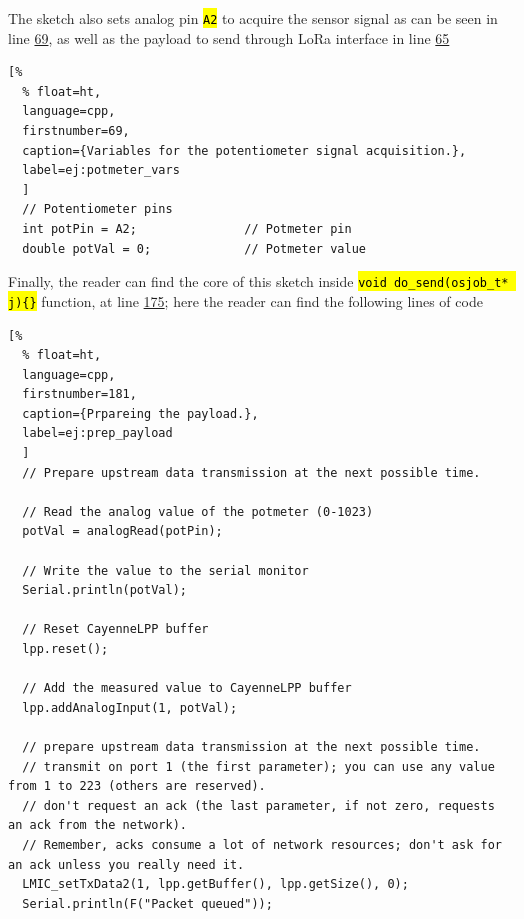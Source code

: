 \documentclass[11pt,a4paper,dvipsnames,twoside]{article}
\newcommand{\cmd}[1] {\hl{\texttt{#1}}}
\begin{document}
The sketch also sets analog pin \cmd{A2} to acquire the sensor signal as can be seen in line \href{https://github.com/WyRe/lora-arduino-dendrometer/blob/master/src/arduino/dendro/dendro.ino#L69}{69}, as well as the payload to send through LoRa interface in line \href{https://github.com/WyRe/lora-arduino-dendrometer/blob/master/src/arduino/dendro/dendro.ino#L65}{65}

\begin{lstlisting}[%
  % float=ht,
  language=cpp,
  firstnumber=69,
  caption={Variables for the potentiometer signal acquisition.},
  label=ej:potmeter_vars
  ]
  // Potentiometer pins
  int potPin = A2;               // Potmeter pin
  double potVal = 0;             // Potmeter value
\end{lstlisting}

Finally, the reader can find the core of this sketch inside \cmd{void do\_send(osjob\_t* j)\{\}} function, at line \href{https://github.com/WyRe/lora-arduino-dendrometer/blob/master/src/arduino/dendro/dendro.ino#L175}{175}; here the reader can find the following lines of code

\begin{lstlisting}[%
  % float=ht,
  language=cpp,
  firstnumber=181,
  caption={Prpareing the payload.},
  label=ej:prep_payload
  ]
  // Prepare upstream data transmission at the next possible time.
        
  // Read the analog value of the potmeter (0-1023)
  potVal = analogRead(potPin);
  
  // Write the value to the serial monitor
  Serial.println(potVal);
         
  // Reset CayenneLPP buffer
  lpp.reset();

  // Add the measured value to CayenneLPP buffer
  lpp.addAnalogInput(1, potVal);

  // prepare upstream data transmission at the next possible time.
  // transmit on port 1 (the first parameter); you can use any value from 1 to 223 (others are reserved).
  // don't request an ack (the last parameter, if not zero, requests an ack from the network).
  // Remember, acks consume a lot of network resources; don't ask for an ack unless you really need it.
  LMIC_setTxData2(1, lpp.getBuffer(), lpp.getSize(), 0);
  Serial.println(F("Packet queued"));
\end{lstlisting}
\end{document}
